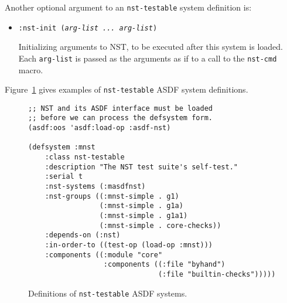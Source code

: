 Another optional argument to an \texttt{nst-testable} system
definition is:
\begin{itemize}
\item\texttt{:nst-init ({\slshape arg-list ...\ arg-list})}\par
  Initializing arguments to NST, to be executed after this system is
  loaded.  Each \texttt{arg-list} is passed as the arguments as if to
  a call to the \texttt{nst-cmd} macro.
\end{itemize}
Figure~\ref{fig:asdf} gives examples of \texttt{nst-testable}
ASDF system definitions.
\begin{figure}
\begin{verbatim}
;; NST and its ASDF interface must be loaded
;; before we can process the defsystem form.
(asdf:oos 'asdf:load-op :asdf-nst)

(defsystem :mnst
    :class nst-testable
    :description "The NST test suite's self-test."
    :serial t
    :nst-systems (:masdfnst)
    :nst-groups ((:mnst-simple . g1)
                 (:mnst-simple . g1a)
                 (:mnst-simple . g1a1)
                 (:mnst-simple . core-checks))
    :depends-on (:nst)
    :in-order-to ((test-op (load-op :mnst)))
    :components ((:module "core"
                  :components ((:file "byhand")
                               (:file "builtin-checks")))))
\end{verbatim}
\caption{Definitions of \texttt{nst-testable} ASDF systems.}
\label{fig:asdf}
\end{figure}

